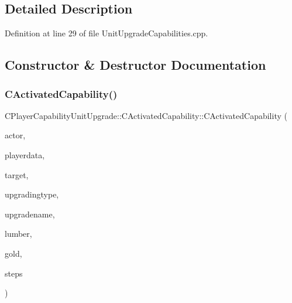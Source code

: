 \subsection{Detailed Description}


Definition at line 29 of file Unit\+Upgrade\+Capabilities.\+cpp.



\subsection{Constructor \& Destructor Documentation}
\hypertarget{classCPlayerCapabilityUnitUpgrade_1_1CActivatedCapability_a567ef5f24fbf77a0be2d7340cd980c4a}{}\label{classCPlayerCapabilityUnitUpgrade_1_1CActivatedCapability_a567ef5f24fbf77a0be2d7340cd980c4a} 
\subsubsection{\texorpdfstring{C\+Activated\+Capability()}{CActivatedCapability()}}
{\footnotesize\ttfamily C\+Player\+Capability\+Unit\+Upgrade\+::\+C\+Activated\+Capability\+::\+C\+Activated\+Capability (\begin{DoxyParamCaption}\item[{std\+::shared\+\_\+ptr$<$ \hyperlink{classCPlayerAsset}{C\+Player\+Asset} $>$}]{actor,  }\item[{std\+::shared\+\_\+ptr$<$ \hyperlink{classCPlayerData}{C\+Player\+Data} $>$}]{playerdata,  }\item[{std\+::shared\+\_\+ptr$<$ \hyperlink{classCPlayerAsset}{C\+Player\+Asset} $>$}]{target,  }\item[{std\+::shared\+\_\+ptr$<$ \hyperlink{classCPlayerAssetType}{C\+Player\+Asset\+Type} $>$}]{upgradingtype,  }\item[{const std\+::string \&}]{upgradename,  }\item[{int}]{lumber,  }\item[{int}]{gold,  }\item[{int}]{steps }\end{DoxyParamCaption})}



